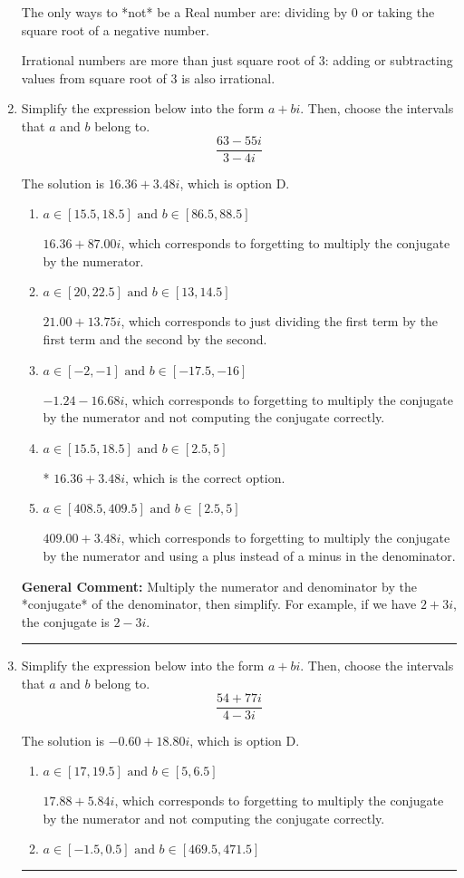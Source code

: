 \documentclass{extbook}[14pt]
\newcommand{\litem}[1]{\item #1

\rule{\textwidth}{0.4pt}}
\begin{document}
\begin{enumerate}
{ The only ways to *not* be a Real number are: dividing by 0 or taking the square root of a negative number. 
 
 Irrational numbers are more than just square root of 3: adding or subtracting values from square root of 3 is also irrational.
}
\litem{
Simplify the expression below into the form $a+bi$. Then, choose the intervals that $a$ and $b$ belong to.
\[ \frac{63 - 55 i}{3 - 4 i} \]

The solution is \( 16.36  + 3.48 i \), which is option D.\begin{enumerate}[label=\Alph*.]
\item \( a \in [15.5, 18.5] \text{ and } b \in [86.5, 88.5] \)

 $16.36  + 87.00 i$, which corresponds to forgetting to multiply the conjugate by the numerator.
\item \( a \in [20, 22.5] \text{ and } b \in [13, 14.5] \)

 $21.00  + 13.75 i$, which corresponds to just dividing the first term by the first term and the second by the second.
\item \( a \in [-2, -1] \text{ and } b \in [-17.5, -16] \)

 $-1.24  - 16.68 i$, which corresponds to forgetting to multiply the conjugate by the numerator and not computing the conjugate correctly.
\item \( a \in [15.5, 18.5] \text{ and } b \in [2.5, 5] \)

* $16.36  + 3.48 i$, which is the correct option.
\item \( a \in [408.5, 409.5] \text{ and } b \in [2.5, 5] \)

 $409.00  + 3.48 i$, which corresponds to forgetting to multiply the conjugate by the numerator and using a plus instead of a minus in the denominator.
\end{enumerate}

\textbf{General Comment:} Multiply the numerator and denominator by the *conjugate* of the denominator, then simplify. For example, if we have $2+3i$, the conjugate is $2-3i$.
}
\litem{
Simplify the expression below into the form $a+bi$. Then, choose the intervals that $a$ and $b$ belong to.
\[ \frac{54 + 77 i}{4 - 3 i} \]

The solution is \( -0.60  + 18.80 i \), which is option D.\begin{enumerate}[label=\Alph*.]
\item \( a \in [17, 19.5] \text{ and } b \in [5, 6.5] \)

 $17.88  + 5.84 i$, which corresponds to forgetting to multiply the conjugate by the numerator and not computing the conjugate correctly.
\item \( a \in [-1.5, 0.5] \text{ and } b \in [469.5, 471.5] \)


\end{enumerate}}
\end{enumerate}
\end{document}
